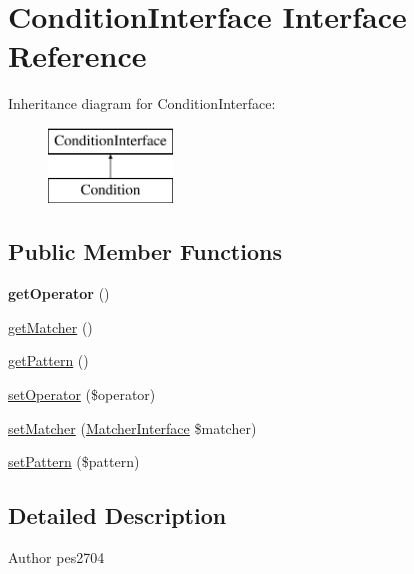 \hypertarget{interface_pes_1_1_query_1_1_condition_interface}{}\section{Condition\+Interface Interface Reference}
\label{interface_pes_1_1_query_1_1_condition_interface}
Inheritance diagram for Condition\+Interface\+:\begin{figure}[H]
\begin{center}
\leavevmode
\includegraphics[height=2.000000cm]{interface_pes_1_1_query_1_1_condition_interface}
\end{center}
\end{figure}
\subsection*{Public Member Functions}
\begin{DoxyCompactItemize}
\item 
\mbox{\label{interface_pes_1_1_query_1_1_condition_interface_aeb1d8b550b38454a92508c857b043df5}} 
{\bfseries get\+Operator} ()
\item 
\mbox{\hyperlink{interface_pes_1_1_query_1_1_condition_interface_aad4538bdde7e273b32661681773c32f0}{get\+Matcher}} ()
\item 
\mbox{\hyperlink{interface_pes_1_1_query_1_1_condition_interface_a86d92279529520a45589a56c2247355e}{get\+Pattern}} ()
\item 
\mbox{\hyperlink{interface_pes_1_1_query_1_1_condition_interface_af7996c125b44ce3a42130ccc56edf9f4}{set\+Operator}} (\$operator)
\item 
\mbox{\hyperlink{interface_pes_1_1_query_1_1_condition_interface_a0d9ceb80245da7ba5be1dbcee4d98a4e}{set\+Matcher}} (\mbox{\hyperlink{interface_pes_1_1_query_1_1_matcher_1_1_matcher_interface}{Matcher\+Interface}} \$matcher)
\item 
\mbox{\hyperlink{interface_pes_1_1_query_1_1_condition_interface_a36b6c101a93edd2abc86e7fc4507b5fa}{set\+Pattern}} (\$pattern)
\end{DoxyCompactItemize}


\subsection{Detailed Description}
\begin{DoxyAuthor}{Author}
pes2704 
\end{DoxyAuthor}


